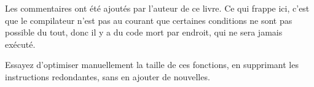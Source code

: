 




Les commentaires ont été ajoutés par l'auteur de ce livre.
Ce qui frappe ici, c'est que le compilateur n'est pas au courant que certaines conditions
ne sont pas possible du tout, donc il y a du code mort par endroit, qui ne sera jamais
exécuté.

\mysubparagraph{\Exercise}

Essayez d'optimiser manuellement la taille de ces fonctions, en supprimant les instructions
redondantes, sans en ajouter de nouvelles.

